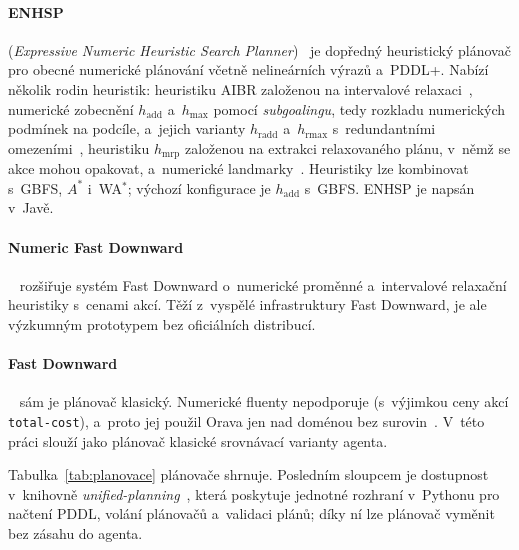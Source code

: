 \paragraph{ENHSP} (\emph{Expressive Numeric Heuristic Search Planner})~\cite{ENHSPweb} je dopředný heuristický plánovač pro obecné numerické plánování včetně nelineárních výrazů a~PDDL+. Nabízí několik rodin heuristik: heuristiku AIBR založenou na intervalové relaxaci~\cite{Scala2016}, numerické zobecnění $h_{\mathrm{add}}$ a~$h_{\max}$ pomocí \emph{subgoalingu}, tedy rozkladu numerických podmínek na podcíle, a~jejich varianty $h_{\mathrm{radd}}$ a~$h_{\mathrm{rmax}}$ s~redundantními omezeními~\cite{Scala2020}, heuristiku $h_{\mathrm{mrp}}$ založenou na extrakci relaxovaného plánu, v~němž se akce mohou opakovat, a~numerické landmarky~\cite{Scala2017}. Heuristiky lze kombinovat s~GBFS, $A^*$ i~WA$^*$; výchozí konfigurace je $h_{\mathrm{add}}$ s~GBFS. ENHSP je napsán v~Javě.

\paragraph{Numeric Fast Downward}~\cite{Aldinger2017} rozšiřuje systém Fast Downward o~numerické proměnné a~intervalové relaxační heuristiky s~cenami akcí. Těží z~vyspělé infrastruktury Fast Downward, je ale výzkumným prototypem bez oficiálních distribucí.

\paragraph{Fast Downward}~\cite{Helmert2006} sám je plánovač klasický. Numerické fluenty nepodporuje (s~výjimkou ceny akcí \texttt{total-cost}), a~proto jej použil Orava jen nad doménou bez surovin~\cite{Orava2025}. V~této práci slouží jako plánovač klasické srovnávací varianty agenta.

Tabulka~\ref{tab:planovace} plánovače shrnuje. Posledním sloupcem je dostupnost v~knihovně \emph{unified-planning}~\cite{Micheli2025}, která poskytuje jednotné rozhraní v~Pythonu pro načtení PDDL, volání plánovačů a~validaci plánů; díky ní lze plánovač vyměnit bez zásahu do agenta.

